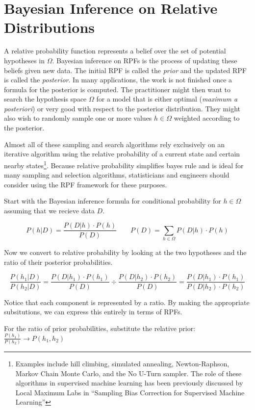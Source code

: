 \documentclass[twoside]{article}
\newcommand{\quotes}[1]{``#1''}
\theoremstyle{plain}%
\theoremstyle{definition}
\theoremstyle{remark}
\begin{document}
\section{Bayesian Inference on Relative Distributions}

A relative probability function represents a belief over the set of potential hypotheses in \(\Omega\). Bayesian inference on RPFs is the process of updating these beliefs given new data. The initial RPF is called the \textit{prior} and the updated RPF is called the \textit{posterior}. In many applications, the work is not finished once a formula for the posterior is computed. The practitioner might then want to search the hypothesis space \(\Omega\) for a model that is either optimal (\textit{maximum a posteriori}) or very good with respect to the posterior distribution. They might also wish to randomly sample one or more values \(h \in \Omega\) weighted according to the posterior.

Almost all of these sampling and search algorithms rely exclusively on an iterative algorithm using the relative probability of a current state and certain nearby states\footnote{Examples include hill climbing, simulated annealing, Newton-Raphson, Markov Chain Monte Carlo, and the No U-Turn sampler. The role of these algorithms in supervised machine learning has been previously discussed by Local Maximum Labs in \quotes{Sampling Bias Correction for Supervised Machine Learning\cite{sklar_bias}}}. Because relative probability simplifies bayes rule and is ideal for many sampling and selection algorithms, statisticians and engineers should consider using the RPF framework for these purposes.

Start with the Bayesian inference formula for conditional probability for \(h \in \Omega\) assuming that we recieve data \(D\).

\[P(h|D) = \frac{P(D|h) \cdot P(h)}{P(D)} \qquad P(D) = \sum_{h \in \Omega} P(D|h) \cdot P(h)\]

Now we convert to relative probability by looking at the two hypotheses and the ratio of their posterior probabilities.

\[\frac{P(h_1|D)}{P(h_2| D)} = \frac{P(D|h_1) \cdot P(h_1)}{P(D)} \div \frac{P(D|h_2) \cdot P(h_2)}{P(D)} = \frac{P(D|h_1) \cdot P(h_1)}{P(D|h_2) \cdot P(h_2)} \]

Notice that each component is represented by a ratio. By making the appropriate subsitutions, we can express this entirely in terms of RPFs.

For the ratio of prior probabilities, substitute the relative prior: \(\frac{P(h_1)}{P(h_2)} \rightarrow P(h_1, h_2) \)
\end{document}
